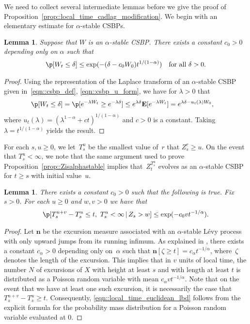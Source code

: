 \documentclass[JEP,XML,SOM,Unicode]{cedram}
\theoremstyle{plain}
\numberwithin{theorem}{section}
\newtheorem{lemma}[theorem]{Lemma}
\theoremstyle{definition}
\newcommand \E {{\mathbf E}}
\newcommand{\giv}{\,|\,}
\begin{document}
We need to collect several intermediate lemmas before we give the proof of Proposition~\ref{prop::local_time_cadlag_modification}. We begin with an elementary estimate for $\alpha$-stable CSBPs.

\begin{lemma}
\label{lem::csbp_terminal_value}
Suppose that $W$ is an $\alpha$-stable CSBP. There exists a constant $c_0 > 0$ depending only on $\alpha$ such that
\[
\p[ W_t \leq \delta] \leq \exp( -(\delta- c_0 W_0) t^{1/(1-\alpha)}) \quad\text{for all } \delta > 0.
\]
\end{lemma}
\begin{proof}
Using the representation of the Laplace transform of an $\alpha$-stable CSBP given in~\eqref{eqn::csbp_def}, \eqref{eqn::csbp_u_form}, we have for $\lambda > 0$ that
\begin{align*}
\p[ W_t \leq \delta]
&= \p[ e^{-\lambda W_t} \geq e^{-\lambda \delta}]
\leq e^{\lambda \delta} \E[ e^{-\lambda W_t}]
= e^{\lambda \delta - u_t(\lambda) W_0},
\end{align*}
where $u_t(\lambda) = (\lambda^{1-\alpha} + c t)^{1/(1-\alpha)}$ and $c > 0$ is a constant. Taking $\lambda = t^{1/(1-\alpha)}$ yields the result.
\end{proof}

For each $s,u \geq 0$, we let~$T_s^u$ be the smallest value of~$r$ that $Z_s^r \geq u$. On the event that $T_s^u < \infty$, we note that the same argument used to prove Proposition~\ref{prop::Zisalphastable} implies that~$Z_t^{T_s^u}$ evolves as an $\alpha$-stable CSBP for $t \geq s$ with initial value~$u$.

\begin{lemma}
\label{lem::length_lbd}
There exists a constant $c_0 > 0$ such that the following is true. Fix $s > 0$. For each $u \geq 0$ and $w,v > 0$ we have that
\begin{equation}
\label{eqn::local_time_euclidean_lbd}
\p[ T_s^{u+v} - T_s^u \leq t,\ T_s^u < \infty \giv Z_s > w] \leq \exp(-c_0 v t^{-1/\alpha}).
\end{equation}
\end{lemma}
\begin{proof}
Let ${\mathbf n}$ be the excursion measure associated with an $\alpha$-stable Lévy process with only upward jumps from its running infimum. As explained in \cite[Chap.\,VIII.4]{bertoinlevybook}, there exists a constant $c_\alpha > 0$ depending only on~$\alpha$ such that ${\mathbf n}[ \zeta \geq t] = c_\alpha t^{-1/\alpha}$, where~$\zeta$ denotes the length of the excursion. This implies that in $v$ units of local time, the number $N$ of excursions of $X$ with height at least $s$ and with length at least $t$ is distributed as a Poisson random variable with mean $c_\alpha v t^{-1/\alpha}$. Note that on the event that we have at least one such excursion, it is necessarily the case that $T_s^{u+v} - T_s^u \geq t$. Consequently, \eqref{eqn::local_time_euclidean_lbd} follows from the explicit formula for the probability mass distribution for a Poisson random variable evaluated at $0$.
\end{proof}
\end{document}
